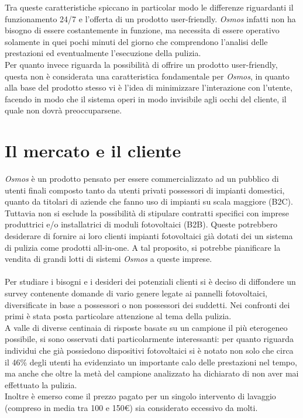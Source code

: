 \documentclass[a4paper, 12pt]{article}
\begin{document}
	Tra queste caratteristiche spiccano in particolar modo le differenze riguardanti il funzionamento 24/7 e l'offerta di un prodotto user-friendly. \emph{Osmos} infatti non ha bisogno di essere costantemente in funzione, ma necessita di essere operativo solamente in quei pochi minuti del giorno che comprendono l'analisi delle prestazioni ed eventualmente l'esecuzione della pulizia.\\
	Per quanto invece riguarda la possibilità di offrire un prodotto user-friendly, questa non è considerata una caratteristica fondamentale per \emph{Osmos}, in quanto alla base del prodotto stesso vi è l'idea di minimizzare l'interazione con l'utente, facendo in modo che il sistema operi in modo invisibile agli occhi del cliente, il quale non dovrà preoccuparsene.
	\section{Il mercato e il cliente}
	\emph{Osmos} è un prodotto pensato per essere commercializzato ad un pubblico di utenti finali composto tanto da utenti privati possessori di impianti domestici, quanto da titolari di aziende che fanno uso di impianti su scala maggiore (B2C).\\
	Tuttavia non si esclude la possibilità di stipulare contratti specifici con imprese produttrici e/o installatrici di moduli fotovoltaici (B2B). Queste potrebbero desiderare di fornire ai loro clienti impianti fotovoltaici già dotati dei un sistema di pulizia come prodotti all-in-one. A tal proposito, si potrebbe pianificare la vendita di grandi lotti di sistemi \emph{Osmos} a queste imprese.\\\\
	Per studiare i bisogni e i desideri dei potenziali clienti si è deciso di diffondere un survey contenente domande di vario genere legate ai pannelli fotovoltaici, diversificate in base a possessori o non possessori dei suddetti. Nei confronti dei primi è stata posta particolare attenzione al tema della pulizia.\\
	A valle di diverse centinaia di risposte basate su un campione il più eterogeneo possibile, si sono osservati dati particolarmente interessanti: per quanto riguarda individui che già possiedono dispositivi fotovoltaici si è notato non solo  che circa il 46\% degli utenti ha evidenziato un importante calo delle prestazioni nel tempo, ma anche che oltre la metà del campione analizzato ha dichiarato di non aver mai effettuato la pulizia.\\
	Inoltre è emerso come il prezzo pagato per un singolo intervento di lavaggio (compreso in media tra 100 e 150\euro) sia considerato eccessivo da molti.
\end{document}
